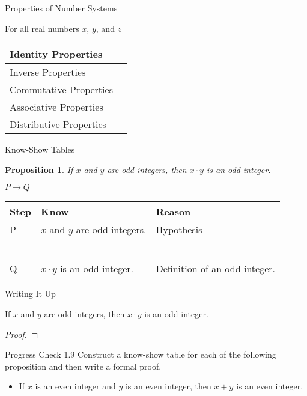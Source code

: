 \documentclass{beamer}
\newtheorem{prop}[theorem]{Proposition}
\begin{document}
\begin{frame}{Properties of Number Systems}
	\begin{center}
		For all real numbers $x$, $y$, and $z$
		{\renewcommand{\arraystretch}{2}
		\begin{tabular}{|p{1.2 in}|p{2.8 in}|}
			\hline
			Identity Properties & \\ \hline
			Inverse Properties & \\ \hline
			Commutative Properties & \\ \hline
			Associative\;\;\; Properties & \\ \hline
			Distributive\;\; Properties & \\ \hline
		\end{tabular}
		}
	\end{center}
\end{frame}

\begin{frame}{Know-Show Tables}
	\begin{prop}
		If $x$ and $y$ are odd integers, then $x \cdot y$ is an odd integer.
	\end{prop}

	\begin{center}
		$P \to Q$
		\begin{tabular}{|l|p{1.75 in}|p{1.75 in}|}
			\hline
			\textbf{Step} & \textbf{Know} & \textbf{Reason} \\ \hline
			P & $x$ and $y$ are odd integers. & Hypothesis\\ \hline
			& \vspace{.3 in} &\\ \hline
			&& \\ \hline
			&& \\ \hline
			&& \\ \hline
			&& \\ \hline
			& \vspace{.2 in} & \\ \hline
			Q & $x \cdot y$ is an odd integer. & Definition of an odd integer.\\ \hline
		\end{tabular}
	\end{center}
\end{frame}

\begin{frame}{Writing It Up}
	\begin{theorem}
		If $x$ and $y$ are odd integers, then $x \cdot y$ is an odd integer.
	\end{theorem}
	\begin{proof}
		\vspace{2 in}
	\end{proof}
\end{frame}

\begin{frame}{Progress Check 1.9}
    Construct a know-show table for each of the following proposition and then write a formal proof.
    \begin{itemize}
        \item If $x$ is an even integer and $y$ is an even integer, then $x+y$ is an even integer.
    \end{itemize}
\end{frame}
\end{document}

